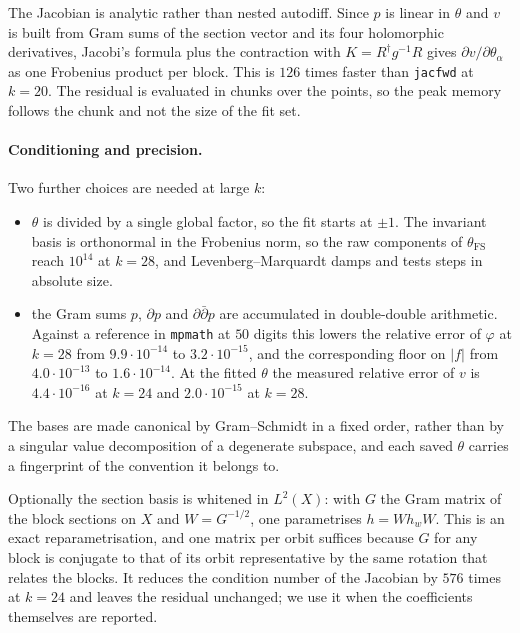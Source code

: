 \documentclass[11pt,a4paper]{article}
\newcommand{\FS}{\mathrm{FS}}
\begin{document}
The Jacobian is analytic rather than nested autodiff. Since $p$ is linear in
$\theta$ and $v$ is built from Gram sums of the section vector and its four
holomorphic derivatives, Jacobi's formula plus the contraction with
$K=R^\dagger g^{-1}R$ gives $\partial v/\partial\theta_\alpha$ as one Frobenius
product per block. This is $126$ times faster than \texttt{jacfwd} at $k=20$.
The residual is evaluated in chunks over the points, so the peak memory follows
the chunk and not the size of the fit set.

\paragraph{Conditioning and precision.}
Two further choices are needed at large $k$:
\begin{itemize}
  \item $\theta$ is divided by a single global factor, so the fit starts at
        $\pm1$. The invariant basis is orthonormal in the Frobenius norm, so the
        raw components of $\theta_\FS$ reach $10^{14}$ at $k=28$, and
        Levenberg--Marquardt damps and tests steps in absolute size.
  \item the Gram sums $p$, $\partial p$ and $\partial\bar\partial p$ are
        accumulated in double-double arithmetic. Against a reference in
        \texttt{mpmath} at $50$ digits this lowers the relative error of
        $\varphi$ at $k=28$ from $9.9\cdot10^{-14}$ to $3.2\cdot10^{-15}$, and
        the corresponding floor on $|f|$ from $4.0\cdot10^{-13}$ to
        $1.6\cdot10^{-14}$. At the fitted $\theta$ the measured relative error of
        $v$ is $4.4\cdot10^{-16}$ at $k=24$ and $2.0\cdot10^{-15}$ at $k=28$.
\end{itemize}
The bases are made canonical by Gram--Schmidt in a fixed order, rather than by a
singular value decomposition of a degenerate subspace, and each saved $\theta$
carries a fingerprint of the convention it belongs to.

Optionally the section basis is whitened in $L^2(X)$: with $G$ the Gram matrix of
the block sections on $X$ and $W=G^{-1/2}$, one parametrises $h=W h_w W$. This is
an exact reparametrisation, and one matrix per orbit suffices because
$G$ for any block is conjugate to that of its orbit representative by the same
rotation that relates the blocks. It reduces the condition number of the
Jacobian by $576$ times at $k=24$ and leaves the residual unchanged; we use it
when the coefficients themselves are reported.
\end{document}

